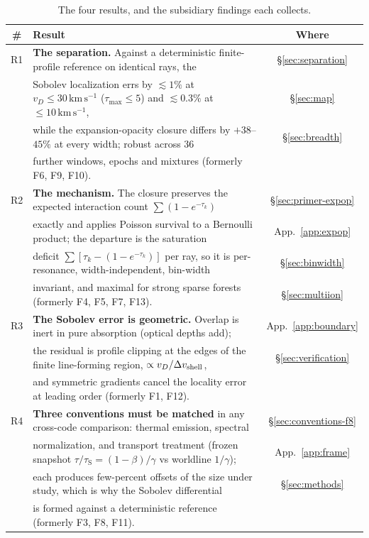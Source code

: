 \documentclass[fleqn,usenatbib]{mnras}
\newcommand{\taus}{\tau_{\mathrm{S}}}
\newcommand{\kms}{\,\mathrm{km\,s^{-1}}}
\begin{document}
\begin{table}[t]
\centering
\caption{The four results, and the subsidiary findings each collects.}
\label{tab:findings}
\begin{tabular}{@{}clc@{}}
\toprule
\# & Result & Where \\
\midrule
R1 & \textbf{The separation.} Against a deterministic finite-profile reference on identical rays, the & \S\ref{sec:separation} \\
   & Sobolev localization errs by $\lesssim1\%$ at $v_D\le30\kms$ ($\tau_{\max}\le5$) and $\lesssim0.3\%$ at $\le10\kms$, & \S\ref{sec:map} \\
   & while the expansion-opacity closure differs by $+38$--$45\%$ at every width; robust across 36 & \S\ref{sec:breadth} \\
   & further windows, epochs and mixtures (formerly F6, F9, F10). & \\[3pt]
R2 & \textbf{The mechanism.} The closure preserves the expected interaction count $\sum(1-e^{-\tau_k})$ & \S\ref{sec:primer-expop} \\
   & exactly and applies Poisson survival to a Bernoulli product; the departure is the saturation & App.~\ref{app:expop} \\
   & deficit $\sum[\tau_k-(1-e^{-\tau_k})]$ per ray, so it is per-resonance, width-independent, bin-width & \S\ref{sec:binwidth} \\
   & invariant, and maximal for strong sparse forests (formerly F4, F5, F7, F13). & \S\ref{sec:multiion} \\[3pt]
R3 & \textbf{The Sobolev error is geometric.} Overlap is inert in pure absorption (optical depths add); & App.~\ref{app:boundary} \\
   & the residual is profile clipping at the edges of the finite line-forming region, $\propto v_D/\Delta v_{\rm shell}$, & \S\ref{sec:verification} \\
   & and symmetric gradients cancel the locality error at leading order (formerly F1, F12). & \\[3pt]
R4 & \textbf{Three conventions must be matched} in any cross-code comparison: thermal emission, spectral & \S\ref{sec:conventions-f8} \\
   & normalization, and transport treatment (frozen snapshot $\tau/\taus=(1-\beta)/\gamma$ vs worldline $1/\gamma$); & App.~\ref{app:frame} \\
   & each produces few-percent offsets of the size under study, which is why the Sobolev differential & \S\ref{sec:methods} \\
   & is formed against a deterministic reference (formerly F3, F8, F11). & \\
\bottomrule
\end{tabular}
\end{table}
\end{document}
